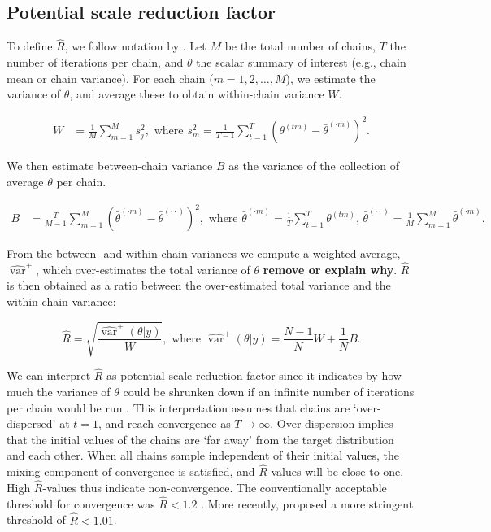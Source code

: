 \documentclass[Royal,times,sageh]{sagej}
\begin{document}
\hypertarget{potential-scale-reduction-factor}{%
\subsection{Potential scale reduction
factor}\label{potential-scale-reduction-factor}}

To define \(\widehat{R}\), we follow notation by \citep[p.~5]{veht19}.
Let \(M\) be the total number of chains, \(T\) the number of iterations
per chain, and \(\theta\) the scalar summary of interest (e.g., chain
mean or chain variance). For each chain (\(m = 1, 2, \dots, M\)), we
estimate the variance of \(\theta\), and average these to obtain
within-chain variance \(W\).

\begin{align*}
W&=\frac{1}{M} \sum_{m=1}^{M} s_{j}^{2},  \text { where } s_{m}^{2}=\frac{1}{T-1} \sum_{t=1}^{T}\left(\theta^{(t m)}-\bar{\theta}^{(\cdot m)}\right)^{2}. 
\end{align*}

We then estimate between-chain variance \(B\) as the variance of the
collection of average \(\theta\) per chain.

\begin{align*}
B&=\frac{T}{M-1} \sum_{m=1}^{M}\left(\bar{\theta}^{(\cdot m)}-\bar{\theta}^{(\cdot \cdot)}\right)^{2}, \text { where } \bar{\theta}^{(\cdot m)}=\frac{1}{T} \sum_{t=1}^{T} \theta^{(t m)} \text{, } \bar{\theta}^{(\cdot \cdot)}=\frac{1}{M} \sum_{m=1}^{M} \bar{\theta}^{(\cdot m)}. 
\end{align*}

From the between- and within-chain variances we compute a weighted
average, \(\widehat{\operatorname{var}}^{+}\), which over-estimates the
total variance of \(\theta\) \textbf{remove or explain why}.
\(\widehat{R}\) is then obtained as a ratio between the over-estimated
total variance and the within-chain variance:

\begin{equation*}
\widehat{R}=\sqrt{\frac{\widehat{\operatorname{var}}^{+}(\theta | y)}{W}},
\text{ where } \widehat{\operatorname{var}}^{+}(\theta | y)=\frac{N-1}{N} W+\frac{1}{N} B.
\end{equation*}

We can interpret \(\widehat{R}\) as potential scale reduction factor
since it indicates by how much the variance of \(\theta\) could be
shrunken down if an infinite number of iterations per chain would be run
\citep{gelm92}. This interpretation assumes that chains are
`over-dispersed' at \(t=1\), and reach convergence as \(T \to \infty\).
Over-dispersion implies that the initial values of the chains are `far
away' from the target distribution and each other. When all chains
sample independent of their initial values, the mixing component of
convergence is satisfied, and \(\widehat{R}\)-values will be close to
one. High \(\widehat{R}\)-values thus indicate non-convergence. The
conventionally acceptable threshold for convergence was
\(\widehat{R} < 1.2\) \citep{gelm92}. More recently, \citet{veht19}
proposed a more stringent threshold of \(\widehat{R} < 1.01\).
\end{document}
